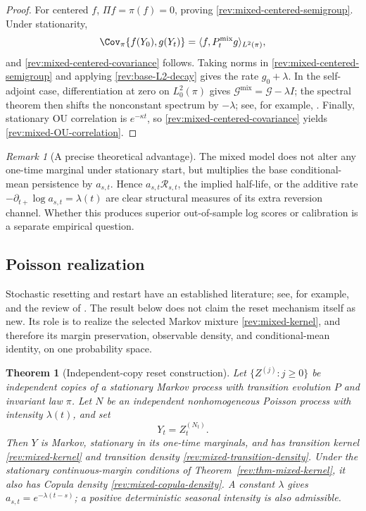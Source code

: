 \documentclass[11pt]{article}
\newtheorem{theorem}[definition]{Theorem}
\theoremstyle{remark}
\newtheorem{remark}[definition]{Remark}
\begin{document}
\begin{proof}
For centered $f$, $\Pi f=\pi(f)=0$, proving
\eqref{rev:mixed-centered-semigroup}.  Under stationarity,
\[
 \Cov_\pi\{f(Y_0),g(Y_t)\}
 =\langle f,P_t^{\mathrm{mix}}g\rangle_{L^2(\pi)},
\]
and \eqref{rev:mixed-centered-covariance} follows.  Taking norms in
\eqref{rev:mixed-centered-semigroup} and applying
\eqref{rev:base-L2-decay} gives the rate $g_0+\lambda$.  In the self-adjoint
case, differentiation at zero on $L_0^2(\pi)$ gives
$\mathcal G^{\mathrm{mix}}=\mathcal G-\lambda I$; the spectral theorem then
shifts the nonconstant spectrum by $-\lambda$; see, for example,
\citet[Chapter~1]{Davies1989}.  Finally, stationary OU
correlation is $e^{-\kappa t}$, so
\eqref{rev:mixed-centered-covariance} yields
\eqref{rev:mixed-OU-correlation}.
\end{proof}

\begin{remark}[A precise theoretical advantage]
The mixed model does not alter any one-time marginal under stationary start,
but multiplies the base conditional-mean persistence by $a_{s,t}$.  Hence
$a_{s,t}\mathcal R_{s,t}$, the implied half-life, or the additive rate
$-\partial_{t+}\log a_{s,t}=\lambda(t)$ are clear structural measures of its
extra reversion channel.  Whether this produces superior out-of-sample log
scores or calibration is a separate empirical question.
\end{remark}

\subsection{Poisson realization}

Stochastic resetting and restart have an established literature; see, for
example, \citet{EvansMajumdar2011} and the review of
\citet{EvansMajumdarSchehr2020}.  The result below does not claim the reset
mechanism itself as new.  Its role is to realize the selected Markov mixture
\eqref{rev:mixed-kernel}, and therefore its margin preservation, observable
density, and conditional-mean identity, on one probability space.

\begin{theorem}[Independent-copy reset construction]
\label{rev:thm-poisson-construction}
Let $\{Z^{(j)}:j\ge0\}$ be independent copies of a stationary Markov process
with transition evolution $P$ and invariant law $\pi$.  Let $N$ be an
independent nonhomogeneous Poisson process with intensity $\lambda(t)$, and set
\begin{equation}
Y_t=Z_t^{(N_t)}.
\label{rev:poisson-copy-process}
\end{equation}
Then $Y$ is Markov, stationary in its one-time marginals, and has transition
kernel \eqref{rev:mixed-kernel} and transition density
\eqref{rev:mixed-transition-density}.  Under the stationary continuous-margin
conditions of Theorem~\ref{rev:thm-mixed-kernel}, it also has Copula density
\eqref{rev:mixed-copula-density}.  A constant $\lambda$ gives
$a_{s,t}=e^{-\lambda(t-s)}$; a positive deterministic seasonal intensity is
also admissible.
\end{theorem}
\end{document}
